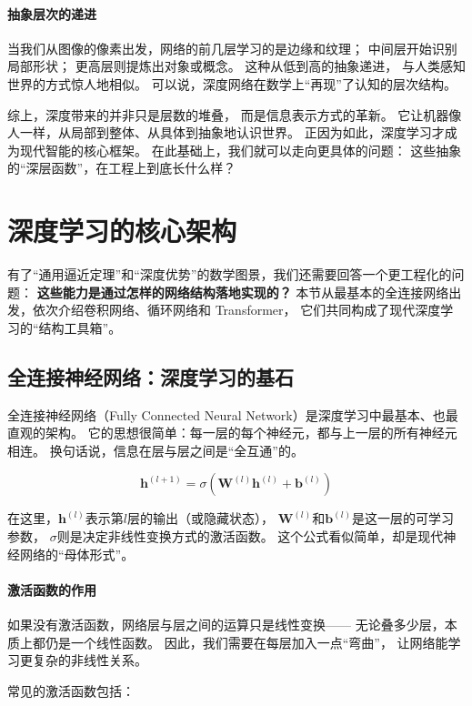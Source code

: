 \paragraph{抽象层次的递进}  
当我们从图像的像素出发，网络的前几层学习的是边缘和纹理；  
中间层开始识别局部形状；  
更高层则提炼出对象或概念。  
这种从低到高的抽象递进，  
与人类感知世界的方式惊人地相似。  
可以说，深度网络在数学上“再现”了认知的层次结构。  

综上，深度带来的并非只是层数的堆叠，  
而是信息表示方式的革新。  
它让机器像人一样，从局部到整体、从具体到抽象地认识世界。  
正因为如此，深度学习才成为现代智能的核心框架。  
在此基础上，我们就可以走向更具体的问题：  
这些抽象的“深层函数”，在工程上到底长什么样？

\section{深度学习的核心架构}

有了“通用逼近定理”和“深度优势”的数学图景，我们还需要回答一个更工程化的问题：  
\textbf{这些能力是通过怎样的网络结构落地实现的？}  
本节从最基本的全连接网络出发，依次介绍卷积网络、循环网络和 Transformer，  
它们共同构成了现代深度学习的“结构工具箱”。

\subsection{全连接神经网络：深度学习的基石}

全连接神经网络（Fully Connected Neural Network）是深度学习中最基本、也最直观的架构。  
它的思想很简单：每一层的每个神经元，都与上一层的所有神经元相连。  
换句话说，信息在层与层之间是“全互通”的。

$$\mathbf{h}^{(l+1)} = \sigma(\mathbf{W}^{(l)} \mathbf{h}^{(l)} + \mathbf{b}^{(l)})$$

在这里，$\mathbf{h}^{(l)}$表示第$l$层的输出（或隐藏状态），  
$\mathbf{W}^{(l)}$和$\mathbf{b}^{(l)}$是这一层的可学习参数，  
$\sigma$则是决定非线性变换方式的激活函数。  
这个公式看似简单，却是现代神经网络的“母体形式”。

\paragraph{激活函数的作用}  
如果没有激活函数，网络层与层之间的运算只是线性变换——  
无论叠多少层，本质上都仍是一个线性函数。  
因此，我们需要在每层加入一点“弯曲”，  
让网络能学习更复杂的非线性关系。  

常见的激活函数包括：

